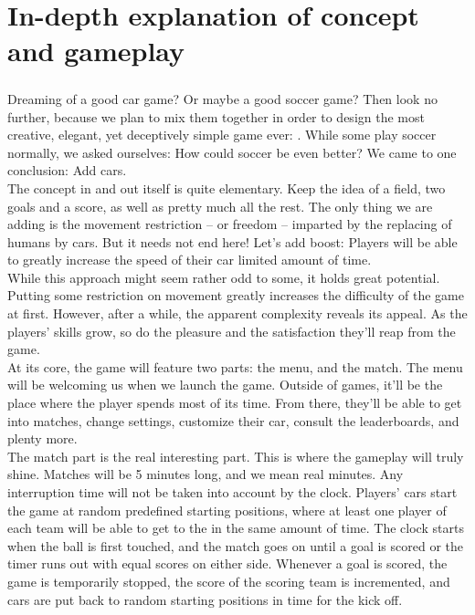 \chapter{In-depth explanation of concept and gameplay}

\paragraph{}Dreaming of a good car game? Or maybe a good soccer game? Then look no further, because we plan to mix them together in order to design the most creative, elegant, yet deceptively simple game ever: \FR. While some play soccer normally, we asked ourselves: How could soccer be even better? We came to one conclusion: Add cars.\\

The concept in and out itself is quite elementary. Keep the idea of a field, two goals and a score, as well as pretty much all the rest. The only thing we are adding is the movement restriction – or freedom – imparted by the replacing of humans by cars. But it needs not end here! Let’s add boost: Players will be able to greatly increase the speed of their car limited amount of time.\\

While this approach might seem rather odd to some, it holds great potential. Putting some restriction on movement greatly increases the difficulty of the game at first. However, after a while, the apparent complexity reveals its appeal. As the players’ skills grow, so do the pleasure and the satisfaction they’ll reap from the game.\\

At its core, the game will feature two parts: the menu, and the match. The menu will be welcoming us when we launch the game. Outside of games, it’ll be the place where the player spends most of its time. From there, they’ll be able to get into matches, change settings, customize their car, consult the leaderboards, and plenty more.\\

The match part is the real interesting part. This is where the gameplay will truly shine. Matches will be 5 minutes long, and we mean real minutes. Any interruption time will not be taken into account by the clock. Players’ cars start the game at random predefined starting positions, where at least one player of each team will be able to get to the in the same amount of time. The clock starts when the ball is first touched, and the match goes on until a goal is scored or the timer runs out with equal scores on either side. Whenever a goal is scored, the game is temporarily stopped, the score of the scoring team is incremented, and cars are put back to random starting positions in time for the kick off.\\

